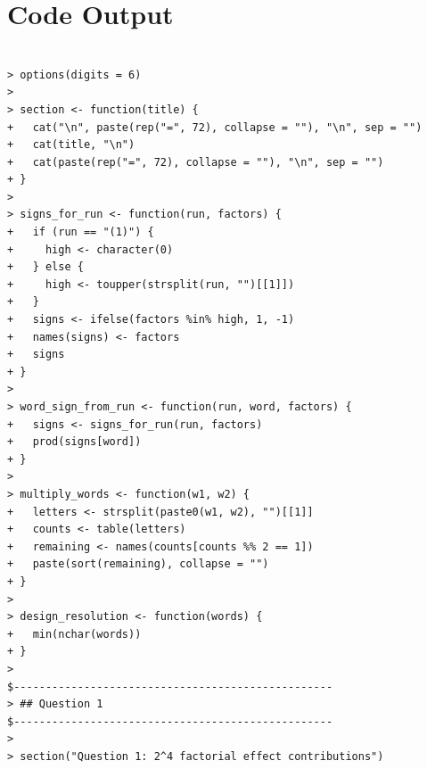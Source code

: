 \documentclass[answers,12pt,addpoints]{exam}
\begin{document}
\section{Code Output}
\tiny

\begin{verbatim}

> options(digits = 6)
> 
> section <- function(title) {
+   cat("\n", paste(rep("=", 72), collapse = ""), "\n", sep = "")
+   cat(title, "\n")
+   cat(paste(rep("=", 72), collapse = ""), "\n", sep = "")
+ }
> 
> signs_for_run <- function(run, factors) {
+   if (run == "(1)") {
+     high <- character(0)
+   } else {
+     high <- toupper(strsplit(run, "")[[1]])
+   }
+   signs <- ifelse(factors %in% high, 1, -1)
+   names(signs) <- factors
+   signs
+ }
> 
> word_sign_from_run <- function(run, word, factors) {
+   signs <- signs_for_run(run, factors)
+   prod(signs[word])
+ }
> 
> multiply_words <- function(w1, w2) {
+   letters <- strsplit(paste0(w1, w2), "")[[1]]
+   counts <- table(letters)
+   remaining <- names(counts[counts %% 2 == 1])
+   paste(sort(remaining), collapse = "")
+ }
> 
> design_resolution <- function(words) {
+   min(nchar(words))
+ }
> 
$--------------------------------------------------                
> ## Question 1
$--------------------------------------------------                
> 
> section("Question 1: 2^4 factorial effect contributions")


\end{verbatim}
\end{document}
